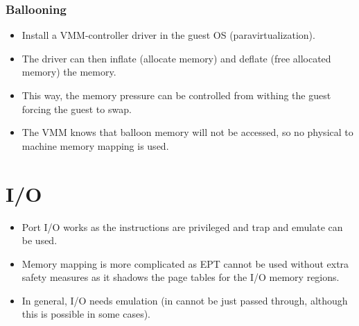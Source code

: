 			\subsubsection{Ballooning}
				\begin{itemize}
					\item Install a VMM-controller driver in the guest OS (paravirtualization).
					\item The driver can then inflate (allocate memory) and deflate (free allocated memory) the memory.
					\item This way, the memory pressure can be controlled from withing the guest forcing the guest to swap.
					\item The VMM knows that balloon memory will not be accessed, so no physical to machine memory mapping is used.
				\end{itemize}

	\section{I/O}
		\begin{itemize}
			\item Port I/O works as the instructions are privileged and trap and emulate can be used.
			\item Memory mapping is more complicated as EPT cannot be used without extra safety measures as it shadows the page tables for the I/O memory regions.
			\item In general, I/O needs emulation (in cannot be just passed through, although this is possible in some cases).
		\end{itemize}

